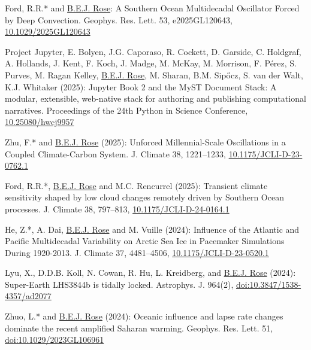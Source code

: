 \documentclass[11pt, letterpaper]{article} %
\newcommand{\years}[1]{\marginnote{\scriptsize #1}} %
\begin{document}
Ford, R.R.* and \underline{B.E.J. Rose}: A Southern Ocean Multidecadal Oscillator Forced by Deep Convection. Geophys. Res. Lett. 53, e2025GL120643, \href{https://doi.org/10.1029/2025GL120643}{10.1029/2025GL120643}
\vspace{0.2 cm}

\years{2025}

Project Jupyter, E. Bolyen, J.G. Caporaso, R. Cockett, D. Garside, C. Holdgraf, A. Hollands, J. Kent, F. Koch, J. Madge, M. McKay, M. Morrison, F. Pérez, S. Purves, M. Ragan Kelley, \underline{B.E.J. Rose}, M. Sharan, B.M. Sipőcz, S. van der Walt, K.J. Whitaker (2025): Jupyter Book 2 and the MyST Document Stack: A modular, extensible, web-native stack for authoring and publishing computational narratives. Proceedings of the 24th Python in Science Conference, \href{https://doi.org/10.25080/hwcj9957}{10.25080/hwcj9957}
\vspace{0.2 cm}

Zhu, F.* and \underline{B.E.J. Rose} (2025): Unforced Millennial-Scale Oscillations in a Coupled Climate-Carbon System. J. Climate 38, 1221--1233, \href{https://doi.org/10.1175/JCLI-D-23-0762.1}{10.1175/JCLI-D-23-0762.1}
\vspace{0.2 cm}

Ford, R.R.*, \underline{B.E.J. Rose} and M.C. Rencurrel (2025): Transient climate sensitivity shaped by low cloud changes remotely driven by Southern Ocean processes. J. Climate 38, 797--813, \href{https://doi.org/10.1175/JCLI-D-24-0164.1}{10.1175/JCLI-D-24-0164.1}
\vspace{0.2 cm}

\years{2024}

He, Z.*, A. Dai, \underline{B.E.J. Rose} and M. Vuille (2024): Influence of the Atlantic and Pacific Multidecadal Variability on Arctic Sea Ice in Pacemaker Simulations During 1920-2013. J. Climate 37, 4481--4506, \href{https://doi.org/10.1175/JCLI-D-23-0520.1}{10.1175/JCLI-D-23-0520.1}
\vspace{0.2 cm}

Lyu, X., D.D.B. Koll, N. Cowan, R. Hu, L. Kreidberg, and \underline{B.E.J. Rose} (2024): Super-Earth LHS3844b is tidally locked. Astrophys. J. 964(2), \href{https://doi.org/10.3847/1538-4357/ad2077}{doi:10.3847/1538-4357/ad2077}
\vspace{0.2 cm}

Zhuo, L.* and \underline{B.E.J. Rose} (2024): Oceanic influence and lapse rate changes dominate the recent amplified Saharan warming. Geophys. Res. Lett. 51, \href{https://doi.org/10.1029/2023GL106961}{doi:10.1029/2023GL106961}
\vspace{0.2 cm}
\end{document}
